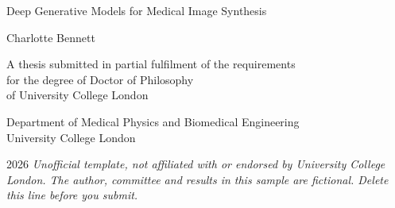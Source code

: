 \begin{titlepage}
\centering
\vspace*{1.2in}
{\LARGE Deep Generative Models for Medical Image Synthesis\par}
\vspace{0.8in}
{\large Charlotte Bennett\par}
\vspace{1in}
A thesis submitted in partial fulfilment of the requirements\\
for the degree of Doctor of Philosophy\\
of University College London\par
\vspace{0.5in}
Department of Medical Physics and Biomedical Engineering\\
University College London\par
\vspace{0.4in}
2026
\vfill
{\footnotesize\itshape Unofficial template, not affiliated with or endorsed by University College London. The author, committee and results in this sample are fictional. Delete this line before you submit.}
\end{titlepage}

